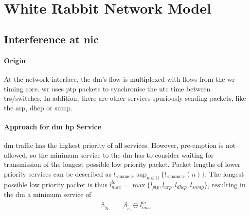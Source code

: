 \section{White Rabbit Network Model}

\subsection{Interference at \gls{nic}}
\paragraph{Origin} At the network interface, the \gls{dm}'s flow is multiplexed with flows from the \gls{wr} timing core. \gls{wr} uses \gls{ptp} packets to synchronise the
\gls{utc} time between \gls{tr}s/switches. In addition, there are other services spuriously sending packets, like the \gls{arp},
\gls{dhcp} or \gls{snmp}. 

\paragraph{Approach for \gls{dm} \gls{hp} Service}
\gls{dm} traffic has the highest priority of all services. However, pre-emption is not allowed, so the minimum service to the \gls{dm} has to consider waiting for transmission of the longest possible low priority packet.
Packet lengths of lower priority services can be described as $l_{\text{<name>}}\sup_{n\in \mathbb{N}}\{l_{\text{<name>}}(n)\}$. 
The longest possible low priority packet is thus $l^{lo}_{max} = \max\{l_{ptp}, l_{arp}, l_{dhcp}, l_{snmp}\}$, resulting in the \gls{dm} a minimum service of
\begin{equation}
\begin{aligned}
\mathrm{\beta_{N}} &= \beta_{r_1} \ominus l^{lo}_{max}
\label{eq:wr-nic}
\end{aligned}
\end{equation}

